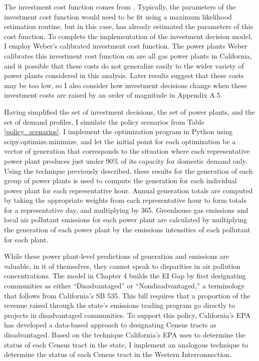 The investment cost function comes from \cite{weber2021dynamic}. Typically, the parameters of the investment cost function would need to be fit using a maximum likelihood estimation routine, but in this case, \cite{weber2021dynamic} has already estimated the parameters of this cost function. To complete the implementation of the investment decision model, I employ Weber's calibrated investment cost function. The power plants Weber calibrates this investment cost function on are all gas power plants in California, and it possible that these costs do not generalize easily to the wider variety of power plants considered in this analysis. Later results suggest that these costs may be too low, so I also consider how investment decisions change when these investment costs are raised by an order of magnitude in Appendix A.5. 

Having simplified the set of investment decisions, the set of power plants, and the set of demand profiles, I simulate the policy scenarios from Table \ref{policy_scenarios}. I implement the optimization program in Python using scipy.optimize.minimize, and let the initial point for each optimization be a vector of generation that corresponds to the situation where each representative power plant produces just under 90\% of its capacity for domestic demand only. Using the technique previously described, these results for the generation of each group of power plants is used to compute the generation for each individual power plant for each representative hour. Annual generation totals are computed by taking the appropriate weights from each representative hour to form totals for a representative day, and multiplying by 365. Greenhouse gas emissions and local air pollutant emissions for each power plant are calculated by multiplying the generation of each power plant by the emissions intensities of each pollutant for each plant. 

While these power plant-level predictions of generation and emissions are valuable, in it of themselves, they cannot speak to disparities in air pollution concentrations. The model in Chapter 4 builds the EI Gap by first designating communities as either ``Disadvantaged'' or ``Nondisadvantaged,'' a terminology that follows from California's SB 535. This bill requires that a proportion of the revenue raised through the state's emissions trading program go directly to projects in disadvantaged communities. To support this policy, California's EPA has developed a data-based approach to designating Census tracts as disadvantaged. Based on the technique California's EPA uses to determine the status of each Census tract in the state, I implement an analogous technique to determine the status of each Census tract in the Western Interconnection. 

